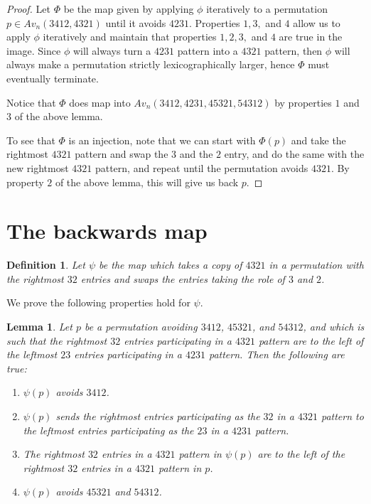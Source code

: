 \documentclass[11pt]{amsart}
\newtheorem{lemma}[theorem]{Lemma}
\newtheorem{definition}[theorem]{Definition}
\theoremstyle{remark}
\numberwithin{equation}{section}
\begin{document}
\begin{proof}
    Let $\Phi$ be the map given by applying $\phi$ iteratively to a permutation $p\in Av_n(3412,4321)$ until it avoids $4231$. Properties $1,3,$ and $4$ allow us to apply $\phi$ iteratively and maintain that properties $1,2,3,$ and $4$ are true in the image. Since $\phi$ will always turn a $4231$ pattern into a $4321$ pattern, then $\phi$ will always make a permutation strictly lexicographically larger, hence $\Phi$ must eventually terminate.

    Notice that $\Phi$ does map into $Av_n(3412,4231,45321,54312)$ by properties $1$ and $3$ of the above lemma.

    To see that $\Phi$ is an injection, note that we can start with $\Phi(p)$ and take the rightmost $4321$ pattern and swap the $3$ and the $2$ entry, and do the same with the new rightmost $4321$ pattern, and repeat until the permutation avoids $4321$. By property $2$ of the above lemma, this will give us back $p$. 
\end{proof}

\section{The backwards map}

\begin{definition}
    Let $\psi$ be the map which takes a copy of $4321$ in a permutation with the rightmost $32$ entries  and swaps the entries taking the role of $3$ and $2$.
\end{definition}

We prove the following properties hold for $\psi$.

\begin{lemma}
    Let $p$ be a permutation avoiding $3412$, $45321$, and $54312$, and which is such that the rightmost $32$ entries participating in a $4321$ pattern are  to the left of the leftmost $23$ entries participating in a $4231$ pattern. Then the following are true:
    \begin{enumerate}
        \item $\psi(p)$ avoids $3412$.
        \item $\psi(p)$ sends the rightmost entries participating as the $32$ in a $4321$ pattern to the leftmost entries participating as the $23$ in a $4231$ pattern.
        \item The rightmost $32$ entries in a $4321$ pattern in $\psi(p)$ are to the left of the rightmost $32$ entries in a $4321$ pattern in $p$.
        \item $\psi(p)$ avoids $45321$ and $54312$.
    \end{enumerate}
\end{lemma}
\end{document}
